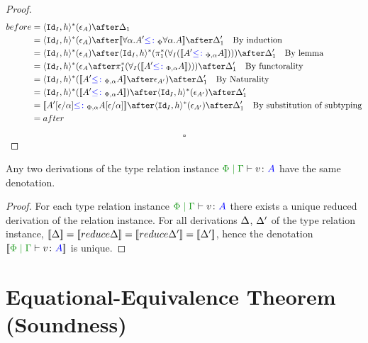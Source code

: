 \documentclass{report}
\begin{document}
\begin{framed}
\begin{proof}
                \begin{align*}
                    before &= \pr{\Id{I}}{h}\star(\e_A)\after\D_1\\
                    &= \pr{\Id{I}}{h}\star(\e_A)\after\deno{\all{\a}{A'}\subtypep{\all{\a}{A}}}\after\D_1'\qt{By induction}\\
                    &= \pr{\Id{I}}{h}\star(\e_A)\after\pr{\Id{I}}{h}\star(\pstar(\allI(\deno{A' \subtypepa A})))\after\D_1'\qt{By lemma}\\
                    &= \pr{\Id{I}}{h}\star(\e_A\after \pstar(\allI(\deno{A' \subtypepa A})))\after\D_1'\qt{By functorality}\\
                    & = \pr{\Id{I}}{h}\star(\deno{A' \subtypepa A}\after\e_{A'})\after\D_1'\qt{By Naturality}\\
                    & =  \pr{\Id{I}}{h}\star(\deno{A' \subtypepa A})\after\pr{\Id{I}}{h}\star(\e_{A'})\after\D_1'\\
                    & =  \deno{A'\ssub{\a}{\e} \subtypepa A\ssub{\a}{\e}}\after\pr{\Id{I}}{h}\star(\e_{A'})\after\D_1'\qt{By substitution of subtyping}\\
                    & = after
                \end{align*}
                
            $$\square$$   
    \end{proof}
\end{framed}


\begin{theorem}
    Any two derivations of the type relation instance $\gpetyperelation{v}{A}$ have the same denotation.
\end{theorem}

\begin{framed}
    \begin{proof}
            For each type relation instance $\gpetyperelation{v}{A}$ there exists a unique reduced derivation of the relation instance. For all derivations $\Delta$, $\Delta'$ of the type relation instance, $\deno{\D} = \deno{\reduce{\D}} = \deno{\reduce{\D'}} = \deno{\D'} $, hence the denotation $\deno{\gpetyperelation{v}{A}}$ is unique.
    \end{proof}
\end{framed}


\chapter{Equational-Equivalence Theorem (Soundness)}
\end{document}
